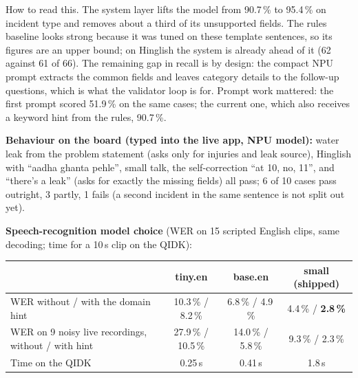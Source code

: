 \documentclass[9pt,a4paper]{extarticle}
\begin{document}
How to read this. The system layer lifts the model from 90.7\,\% to 95.4\,\% on incident type and removes about a third of its unsupported fields. The rules baseline looks strong because it was tuned on these template sentences, so its figures are an upper bound; on Hinglish the system is already ahead of it (62 against 61 of 66). The remaining gap in recall is by design: the compact NPU prompt extracts the common fields and leaves category details to the follow-up questions, which is what the validator loop is for. Prompt work mattered: the first prompt scored 51.9\,\% on the same cases; the current one, which also receives a keyword hint from the rules, 90.7\,\%.

\textbf{Behaviour on the board (typed into the live app, NPU model):} water leak from the problem statement (asks only for injuries and leak source), Hinglish with ``aadha ghanta pehle'', small talk, the self-correction ``at 10, no, 11'', and ``there's a leak'' (asks for exactly the missing fields) all pass; 6 of 10 cases pass outright, 3 partly, 1 fails (a second incident in the same sentence is not split out yet).

\textbf{Speech-recognition model choice} (WER on 15 scripted English clips, same decoding; time for a 10\,s clip on the QIDK):

\begin{center}
\begin{tabular}{@{}lccc@{}}
\toprule
 & \textbf{tiny.en} & \textbf{base.en} & \textbf{small (shipped)}\\
\midrule
WER without / with the domain hint & 10.3\,\% / 8.2\,\% & 6.8\,\% / 4.9\,\% & 4.4\,\% / \textbf{2.8\,\%}\\
WER on 9 noisy live recordings, without / with hint & 27.9\,\% / 10.5\,\% & 14.0\,\% / 5.8\,\% & 9.3\,\% / 2.3\,\%\\
Time on the QIDK & 0.25\,s & 0.41\,s & 1.8\,s\\
\bottomrule
\end{tabular}
\end{center}
\end{document}
